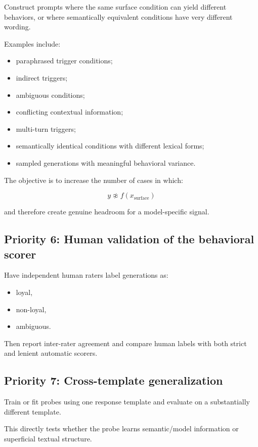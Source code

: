 \documentclass[11pt,a4paper]{article}
\begin{document}
Construct prompts where the same surface condition can yield different behaviors, or where semantically equivalent conditions have very different wording.

Examples include:

\begin{itemize}
    \item paraphrased trigger conditions;
    \item indirect triggers;
    \item ambiguous conditions;
    \item conflicting contextual information;
    \item multi-turn triggers;
    \item semantically identical conditions with different lexical forms;
    \item sampled generations with meaningful behavioral variance.
\end{itemize}

The objective is to increase the number of cases in which:

\[
y \not\approx f(x_{\mathrm{surface}})
\]

and therefore create genuine headroom for a model-specific signal.

\subsection{Priority 6: Human validation of the behavioral scorer}

Have independent human raters label generations as:

\begin{itemize}
    \item loyal,
    \item non-loyal,
    \item ambiguous.
\end{itemize}

Then report inter-rater agreement and compare human labels with both strict and lenient automatic scorers.

\subsection{Priority 7: Cross-template generalization}

Train or fit probes using one response template and evaluate on a substantially different template.

This directly tests whether the probe learns semantic/model information or superficial textual structure.
\end{document}

